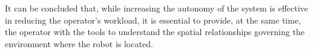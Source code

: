 \documentclass[a4paper, 10pt, conference]{ieeeconf}     %
\begin{document}
It can be concluded that, while increasing the autonomy of the system is effective in reducing the operator’s workload, it is essential to provide, at the same time, the operator with the tools to understand the spatial relationships governing the environment where the robot is located.
\end{document}
